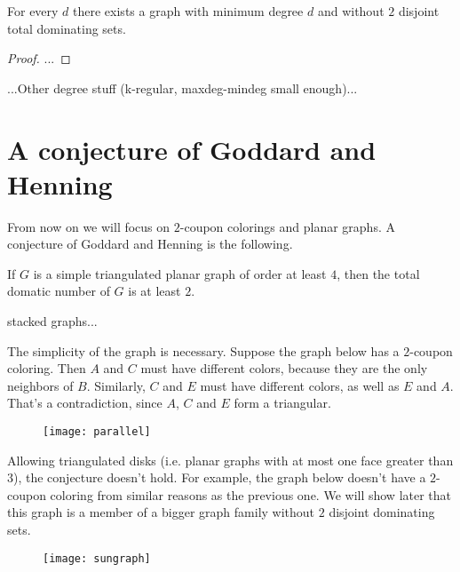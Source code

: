 \begin{thm}
  For every $d$ there exists a graph with minimum degree $d$ and without $2$
  disjoint total dominating sets.
\end{thm}
\begin{proof}
  ...
\end{proof}

...Other degree stuff (k-regular, maxdeg-mindeg small enough)...

\section{A conjecture of Goddard and Henning}

From now on we will focus on $2$-coupon colorings and planar graphs. A
conjecture of Goddard and Henning is the following.

\begin{conj}
  If $G$ is a simple triangulated planar graph of order at least $4$, then the
  total domatic number of $G$ is at least $2$.
\end{conj}

stacked graphs...

\begin{remark}
  The simplicity of the graph is necessary. Suppose the graph below has a
  $2$-coupon coloring. Then $A$ and $C$ must have different colors, because
  they are the only neighbors of $B$. Similarly, $C$ and $E$ must have different
  colors, as well as $E$ and $A$. That's a contradiction, since $A$, $C$ and
  $E$ form a triangular.
\end{remark}

\begin{figure}[h]
  \centering
  \texttt{[image: parallel]}
\end{figure}

\begin{remark}
  Allowing triangulated disks (i.e. planar graphs with at most one face greater
  than $3$), the conjecture doesn't hold. For example, the graph below doesn't
  have a $2$-coupon coloring from similar reasons as the previous one. We will
  show later that this graph is a member of a bigger graph family without $2$
  disjoint dominating sets.
\end{remark}

\begin{figure}[h]
  \centering
  \texttt{[image: sungraph]}
\end{figure}

